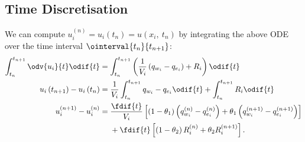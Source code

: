 \documentclass{article}
\begin{document}
\subsection{Time Discretisation}
We can compute \(u_i^{\left( n \right)} = u_i\left( t_n \right) =
u\left( x_i,\: t_n \right)\) by integrating the above ODE over the time
interval \(\ointerval{t_n}{t_{n+1}}\):
\begin{align*}
    \int_{t_n}^{t_{n+1}} \odv{u_i}{t} \odif{t}        & = \int_{t_n}^{t_{n+1}} \left( \frac{1}{V_i} \left( q_{w_i} - q_{e_i} \right) + R_i \right) \odif{t} \\
    u_i\left( t_{n+1} \right) - u_i\left( t_n \right) & = \frac{1}{V_i} \int_{t_n}^{t_{n+1}} q_{w_i} - q_{e_i} \odif{t} + \int_{t_n}^{t_{n+1}} R_i \odif{t} \\
    u_i^{\left( n+1 \right)} - u_i^{\left( n \right)} & =
    \begin{aligned}[t]
         & {}\frac{\fdif{t}}{V_i} \left[ \left( 1 - \theta_1 \right) \left( q_{w_i}^{\left( n \right)} - q_{e_i}^{\left( n \right)} \right) + \theta_1 \left( q_{w_i}^{\left( n+1 \right)} - q_{e_i}^{\left( n+1 \right)} \right) \right] \\
         & {}+ \fdif{t} \left[ \left( 1 - \theta_2 \right) R_i^{\left( n \right)} + \theta_2 R_i^{\left( n+1 \right)} \right].
    \end{aligned}
\end{align*}
\end{document}
